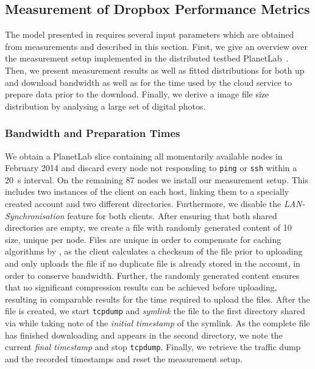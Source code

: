 \subsection{Measurement of Dropbox Performance Metrics}\label{sec:application:cloud_file_synchronisation:application_measurements}
The model presented in  requires several input parameters which are obtained from measurements and described in this section.
First, we give an overview over the measurement setup implemented in the distributed testbed PlanetLab~\cite{Chun2003}.
Then, we present measurement results as well as fitted distributions for both up and download bandwidth as well as for the time used by the cloud service to prepare data prior to the download.
Finally, we derive a image file size distribution by analysing a large set of digital photos.

\subsubsection*{Bandwidth and Preparation Times}\label{sec:application:cloud_file_synchronisation:application_measurements:bandwidth_preparation_times}
We obtain a PlanetLab slice containing all momentarily available nodes in February 2014 and discard every node not responding to \texttt{ping} or \texttt{ssh} within a \SI{20}{\second} interval.
On the remaining \(87\) nodes we install our measurement setup.
This includes two instances of the \dropbox client on each host, linking them to a specially created \dropbox account and two different directories.
Furthermore, we disable the \emph{LAN-Synchronisation} feature for both clients.
After ensuring that both shared directories are empty, we create a file with randomly generated content of \SI{10}{\mega\bit} size, unique per node.
Files are unique in order to compensate for caching algorithms by \dropbox, as the client calculates a checksum of the file prior to uploading and only uploads the file if no duplicate file is already stored in the account, in order to conserve bandwidth.
Further, the randomly generated content ensures that no significant compression results can be achieved before uploading, resulting in comparable results for the time required to upload the files.
After the file is created, we start \texttt{tcpdump} and \emph{symlink} the file to the first directory shared via \dropbox while taking note of the \emph{initial timestamp} of the symlink.
As the complete file has finished downloading and appears in the second \dropbox directory, we note the current \emph{final timestamp} and stop \texttt{tcpdump}.
Finally, we retrieve the traffic dump and the recorded timestamps and reset the measurement setup.

